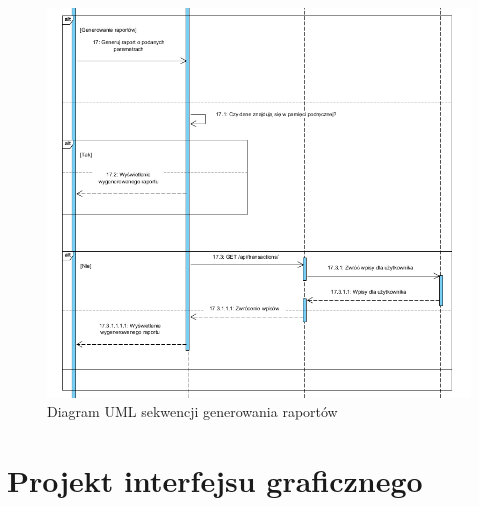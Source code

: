 \documentclass{article}
\begin{document}
	\begin{figure}[H]
		
		\hspace*{-3cm} 
		\includegraphics[scale=0.9]{assets/umlSEQ7.png}
		\caption[]{Diagram UML sekwencji generowania raportów}
		\label{fig:umlrap}
	\end{figure} 
	
	\section{Projekt interfejsu graficznego}
	
\end{document}
